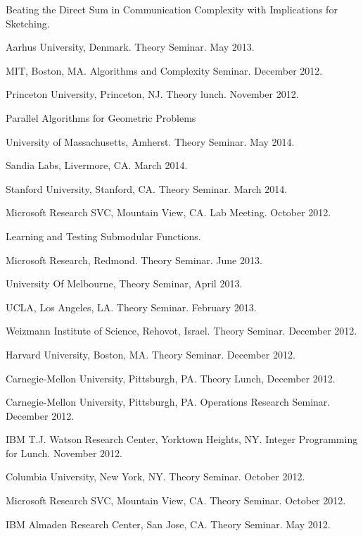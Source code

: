 \documentclass[11pt]{article}
\newenvironment{innerlist}[1][\enskip\textbullet]%
        {\begin{compactitem}[#1]}{\end{compactitem}}
\begin{document}
\begin{innerlist}
\item Beating the Direct Sum in Communication Complexity with Implications for Sketching.
\begin{innerlist}
\item Aarhus University, Denmark. Theory Seminar. May 2013.
\item MIT, Boston, MA. Algorithms and Complexity Seminar. December 2012.
\item Princeton University, Princeton, NJ. Theory lunch. November 2012.
\end{innerlist}


\item Parallel Algorithms for Geometric Problems
\begin{innerlist}
\item University of Massachusetts, Amherst. Theory Seminar. May 2014.
\item Sandia Labs, Livermore, CA. March 2014.
\item Stanford University, Stanford, CA. Theory Seminar. March 2014.
\item Microsoft Research SVC, Mountain View, CA. Lab Meeting. October 2012.
\end{innerlist}

\item Learning and Testing Submodular Functions.
\begin{innerlist}
  \item Microsoft Research, Redmond. Theory Seminar. June 2013.
  \item University Of Melbourne, Theory Seminar, April 2013.
  \item UCLA, Los Angeles, LA. Theory Seminar. February 2013.
  \item Weizmann Institute of Science, Rehovot, Israel. Theory Seminar. December 2012.  
  \item Harvard University, Boston, MA. Theory Seminar. December 2012.
  \item Carnegie-Mellon University, Pittsburgh, PA. Theory Lunch, December 2012.
  \item Carnegie-Mellon University, Pittsburgh, PA. Operations Research Seminar. December 2012.
  \item IBM T.J. Watson Research Center, Yorktown Heights, NY. Integer Programming for Lunch. November 2012.
  \item Columbia University, New York, NY. Theory Seminar. October 2012.
  \item Microsoft Research SVC, Mountain View, CA. Theory Seminar. October 2012.
  \item IBM Almaden Research Center, San Jose, CA. Theory Seminar. May 2012.
\end{innerlist}


\end{innerlist}
\end{document}
